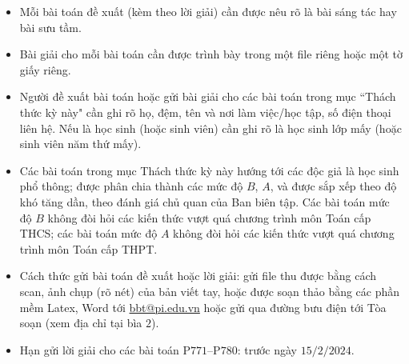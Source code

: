 \thispagestyle{thachthuctoanhocnone}
\pagestyle{thachthuctoanhoc}
\everymath{\color{thachthuctoanhoc}}
\graphicspath{{../thachthuctoanhoc/pic/}}
\begingroup
{}
\centering
\vspace*{4cm}
\endgroup
\vspace*{-8pt}
\begin{tBox}
	\begin{itemize}[leftmargin = 13pt, itemsep = 1.0pt] 
		\item Mỗi bài toán đề xuất (kèm theo lời giải) cần được nêu rõ là bài sáng tác hay bài sưu tầm.
		\item Bài giải cho mỗi bài toán cần được trình bày trong một file riêng hoặc
		một tờ giấy riêng.
		\item  Người đề xuất bài toán hoặc gửi bài giải cho các bài toán trong mục ``Thách thức kỳ này" cần ghi rõ họ, đệm, tên và nơi làm việc/học tập, số điện thoại liên hệ. Nếu là học sinh (hoặc sinh viên) cần ghi rõ là học sinh lớp mấy (hoặc sinh viên năm thứ mấy).
		\item Các bài toán trong mục Thách thức kỳ này hướng tới các độc giả là học sinh phổ thông; được phân chia thành các mức độ $B$, $A$, và được sắp xếp theo độ khó tăng dần, theo đánh giá chủ quan của Ban biên tập. Các bài toán mức độ $B$ không đòi hỏi các kiến thức vượt quá chương trình môn Toán cấp THCS; các bài toán mức độ $A$ không đòi hỏi các kiến thức vượt quá chương trình môn Toán cấp THPT.
		\item Cách thức gửi bài toán đề xuất hoặc lời giải: gửi file thu được bằng cách scan, ảnh chụp (rõ nét) của bản viết tay, hoặc được soạn thảo bằng các phần mềm Latex, Word tới \url{bbt@pi.edu.vn} hoặc gửi qua đường bưu điện tới Tòa soạn (xem địa chỉ tại bìa $2$).
		\item Hạn gửi lời giải cho các bài toán P$771$--P$780$: trước ngày $15/2/2024$.
	\end{itemize}
\end{tBox}
